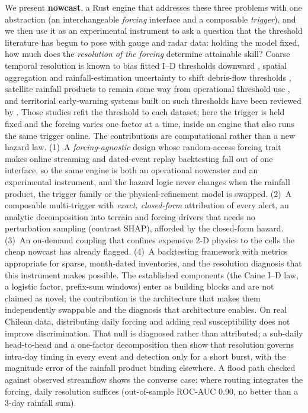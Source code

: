 \documentclass[authoryear,preprint,review,12pt]{elsarticle}
\begin{document}
We present \textbf{nowcast}, a Rust engine that addresses these three problems
with one abstraction (an interchangeable \emph{forcing} interface and a
composable \emph{trigger}), and we then use it as an experimental instrument to
ask a question that the threshold literature has begun to pose with gauge and radar data: holding the model fixed, how much does the
\emph{resolution of the forcing} determine attainable skill? Coarse temporal resolution is known to bias fitted I--D thresholds downward \citep{marra2019,gariano2020}, spatial aggregation and rainfall-estimation uncertainty to shift debris-flow thresholds \citep{marra2017,nikolopoulos2014}, satellite rainfall products to remain some way from operational threshold use \citep{brunetti2018}, and territorial early-warning systems built on such thresholds have been reviewed by \citet{piciullo2018}. Those studies refit the threshold to each dataset; here the trigger is held fixed and the forcing varies one factor at a time, inside an engine that also runs the same trigger online. The contributions
are computational rather than a new hazard law. (1)~A \emph{forcing-agnostic}
design whose random-access forcing trait makes online streaming and dated-event
replay backtesting fall out of one interface, so the same engine is both an
operational nowcaster and an experimental instrument, and the hazard logic never
changes when the rainfall product, the trigger family or the physical-refinement
model is swapped. (2)~A composable multi-trigger with \emph{exact, closed-form}
attribution of every alert, an analytic decomposition into terrain and forcing
drivers that needs no perturbation sampling (contrast SHAP), afforded by the
closed-form hazard. (3)~An on-demand coupling that confines expensive 2-D physics
to the cells the cheap nowcast has already flagged. (4)~A backtesting framework
with metrics appropriate for sparse, month-dated inventories, and the resolution
diagnosis that this instrument makes possible. The established components (the
Caine I--D law, a logistic factor, prefix-sum windows) enter as building blocks
and are not claimed as novel; the contribution is the architecture that makes
them independently swappable and the diagnosis that architecture enables. On real Chilean data, distributing daily forcing and adding real susceptibility does not improve discrimination. That null is diagnosed rather than attributed; a sub-daily head-to-head and a one-factor decomposition then show that resolution governs intra-day timing in every event and detection only for a short burst, with the magnitude error of the rainfall product binding elsewhere. A flood path checked against observed streamflow shows the converse case: where routing integrates the forcing, daily resolution suffices (out-of-sample ROC-AUC 0.90, no better than a 3-day rainfall sum).
\end{document}
